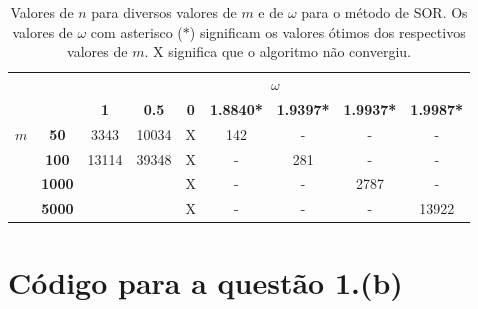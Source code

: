 \documentclass{article}
\begin{document}
\begin{enumerate}
\begin{enumerate}
                \begin{table}[!h]
                    \centering
                    \begin{tabular}{cc|c|c|c|c|c|c|c|}
                        \cline{3-9}
                                            &               & \multicolumn{7}{c|}{\textbf{$\omega$}}      \\ \cline{3-9} 
                        &
                        &
                        \textbf{1} &
                        \textbf{0.5} &
                        \textbf{0} &
                        \textbf{1.8840*} &
                        \textbf{1.9397*} &
                        \textbf{1.9937*} &
                        \textbf{1.9987*} \\ \hline
                        \multicolumn{1}{|c|}{\multirow{4}{*}{\textbf{$m$}}} &
                        \textbf{50} &
                        3343 &
                        10034 &
                        X &
                        142 &
                        - &
                        - &
                        - \\ \cline{2-9} 
                        \multicolumn{1}{|c|}{} & \textbf{100}  & 13114 & 39348 & X & - & 281 & -    & -     \\ \cline{2-9} 
                        \multicolumn{1}{|c|}{} & \textbf{1000} &       &       & X & - & -   & 2787 & -     \\ \cline{2-9} 
                        \multicolumn{1}{|c|}{} & \textbf{5000} &       &       & X & - & -   & -    & 13922 \\ \hline
                    \end{tabular}
                    \caption{Valores de $n$ para diversos valores de $m$ e de $\omega$ para o método de SOR. Os valores de $\omega$ com asterisco ($*$)
                    significam os valores ótimos dos respectivos valores de $m$. X significa que o algoritmo não convergiu.}
                    \label{tab:omega_m}
                \end{table}
                
        \end{enumerate}
    \end{enumerate}

    \appendix

    \section{Código para a questão 1.(b)}
        \label{appendix:a}
\end{document}
